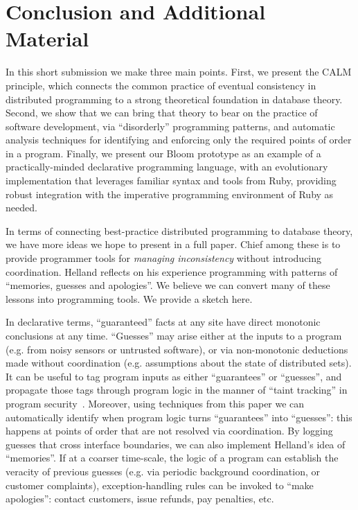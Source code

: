 \section{Conclusion and Additional Material}
\label{sec:conclusion}
In this short submission we make three main points.  First, we present the CALM principle, which connects the common practice of eventual consistency in distributed programming to a strong theoretical foundation in database theory.  Second, we show that we can bring that theory to bear on the practice of software development, via ``disorderly'' programming patterns, and automatic analysis techniques for  identifying and enforcing only the required points of order in a program. Finally, we present our Bloom prototype as an example of a practically-minded declarative programming language, with an evolutionary implementation that leverages familiar syntax and tools from Ruby, providing robust integration with the imperative programming environment of Ruby as needed.

In terms of connecting best-practice distributed programming to database theory, we have more ideas we hope to present in a full paper.  Chief among these is to provide programmer tools for \emph{managing inconsistency} without introducing coordination.  Helland reflects on his experience programming with patterns of ``memories, guesses and apologies''.  We believe we can convert many of these lessons into programming tools.  We provide a sketch here.

In declarative terms, ``guaranteed'' facts at any site have direct monotonic conclusions at any time.  ``Guesses'' may arise either at the inputs to a program (e.g. from noisy sensors or untrusted software), or via non-monotonic deductions made without coordination (e.g. assumptions about the state of distributed sets).  It can be useful to tag program inputs as either ``guarantees'' or ``guesses'', and propagate those tags through program logic in the manner of ``taint tracking'' in program security~\cite{taint}.  Moreover, using techniques from this paper we can automatically identify when program logic turns ``guarantees'' into ``guesses'': this happens at points of order that are not resolved via coordination.    
By logging guesses that cross interface boundaries, we can also implement Helland's idea of ``memories''.  If at a coarser time-scale, the logic of a program can establish the veracity of previous guesses (e.g. via periodic background coordination, or customer complaints), exception-handling rules can be invoked to ``make apologies'': contact customers, issue refunds, pay penalties, etc.  

